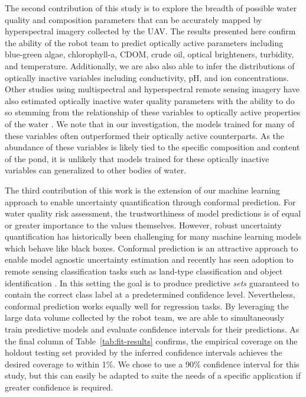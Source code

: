 \documentclass[remotesensing,article,submit,pdftex,moreauthors]{Definitions/mdpi}
\begin{document}
The second contribution of this study is to explore the breadth of possible water quality and composition parameters that can be accurately mapped by hyperspectral imagery collected by the UAV. The results presented here confirm the ability of the robot team to predict optically active parameters including blue-green algae, chlorophyll-a, CDOM, crude oil, optical brighteners, turbidity, and temperature. Additionally, we are also also able to infer the distributions of optically inactive variables including conductivity, pH, and ion concentrations. Other studies using multispectral and hyperspectral remote sensing imagery have also estimated optically inactive water quality parameters with the ability to do so stemming from the relationship of these variables to optically active properties of the water \cite{vakili2020determination,guo2021machine,niu2021deep}. We note that in our investigation, the models trained for many of these variables often outperformed their optically active counterparts. As the abundance of these variables is likely tied to the specific composition and content of the pond, it is unlikely that models trained for these optically inactive variables can generalized to other bodies of water. 

The third contribution of this work is the extension of our machine learning approach to enable uncertainty quantification through conformal prediction. For water quality risk assessment, the trustworthiness of model predictions is of equal or greater importance to the values themselves. However, robust uncertainty quantification has historically been challenging for many machine learning models which behave like black boxes.
Conformal prediction is an attractive approach to enable model agnostic uncertainty estimation and recently has seen adoption to remote sensing classification tasks such as land-type classification and object identification \cite{valle2023quantifying, zhu2024inductive}. In this setting the goal is to produce predictive \textit{sets} guaranteed to contain the correct class label at a predetermined confidence level. Nevertheless, conformal prediction works equally well for regression tasks. By leveraging the large data volume collected by the robot team, we are able to simultaneously train predictive models and evaluate confidence intervals for their predictions. As the final column of Table~\ref{tab:fit-results} confirms, the empirical coverage on the holdout testing set provided by the inferred confidence intervals achieves the desired coverage to within 1\%. We chose to use a 90\% confidence interval for this study, but this can easily be adapted to suite the needs of a specific application if greater confidence is required. 
\end{document}
